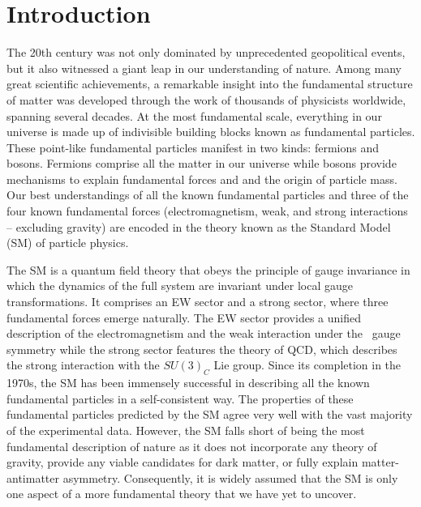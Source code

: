 \chapter{Introduction}
\label{chap:Introduction}

The 20th century was not only dominated by unprecedented geopolitical events, but it also witnessed a giant leap in our understanding of nature. Among many great scientific achievements, a remarkable insight into the fundamental structure of matter was developed through the work of thousands of physicists worldwide, spanning several decades. At the most fundamental scale, everything in our universe is made up of indivisible building blocks known as fundamental particles. These point-like fundamental particles manifest in two kinds: fermions and bosons. Fermions comprise all the matter in our universe while bosons provide mechanisms to explain fundamental forces and and the origin of particle mass. Our best understandings of all the known fundamental particles and three of the four known fundamental forces (electromagnetism, weak, and strong interactions -- excluding gravity) are encoded in the theory known as the Standard Model (\ac{SM}) of particle physics.

The \ac{SM} is a quantum field theory that obeys the principle of gauge invariance in which the dynamics of the full system are invariant under local gauge transformations. It comprises an \ac{EW} sector and a strong sector, where three fundamental forces emerge naturally. The \ac{EW} sector provides a unified description of the electromagnetism and the weak interaction under the \ew~gauge symmetry while the strong sector features the theory of \ac{QCD}, which describes the strong interaction with the $SU(3)_{C}$ Lie group. Since its completion in the 1970s, the \ac{SM} has been immensely successful in describing all the known fundamental particles in a self-consistent way. The properties of these fundamental particles predicted by the \ac{SM} agree very well with the vast majority of the experimental data. However, the \ac{SM} falls short of being the most fundamental description of nature as it does not incorporate any theory of gravity, provide any viable candidates for dark matter, or fully explain matter-antimatter asymmetry. Consequently, it is widely assumed that the \ac{SM} is only one aspect of a more fundamental theory that we have yet to uncover.

